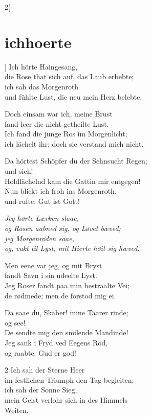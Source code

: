 \documentclass[shorttitlesize=45,tocstyle=ref]{ees}
\begin{document}
{\begin{multicols}{2}[\section{ichhoerte}]
Ich hörte Haingesang,\\
die Rose that sich auf, das Laub erbebte;\\
ich sah das Morgenroth\\
und fühlte Lust, die neu mein Herz belebte.

Doch einsam war ich, meine Brust\\
fand leer die nicht getheilte Lust.\\
Ich fand die junge Ros im Morgenlicht;\\
ich lächelt ihr; doch sie verstand mich nicht.

Da hörtest Schöpfer du der Sehnsucht Regen;\\
und sieh!\\
Holdlächelnd kam die Gattin mir entgegen!\\
Nun blickt ich froh ins Morgenroth,\\
und rufte: Gut ist Gott!

\columnbreak\itshape
Jeg hørte Lærken slaae,\\
og Rosen aabned sig, og Løvet bæved;\\
jeg Morgenrøden saae,\\
og, vakt til Lyst, mit Hierte høit sig hæved.

Men eene var jeg, og mit Bryst\\
fandt Savn i sin udeelte Lyst.\\
Jeg Roser fandt paa min bestraalte Vei;\\
de rødmede; men de forstod mig ei.

Da saae du, Skaber! mine Taarer rinde;\\
og see!\\
De sendte mig den smilende Mandinde!\\
Jeg sank i Fryd ved Eegens Rod,\\
og raabte: Gud er god!
\end{multicols}

\begin{multicols}{2}
Ich sah der Sterne Heer\\
im festlichen Triumph den Tag begleiten;\\
ich sah der Sonne Sieg,\\
mein Geist verlohr sich in des Himmels\\
\hspace*{1em}Weiten.


\end{multicols}}
\end{document}
